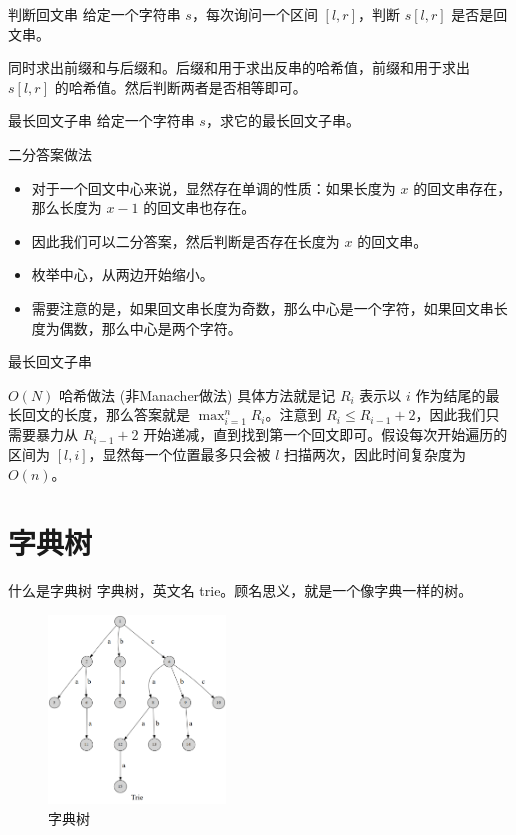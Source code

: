 \documentclass{ldr-simple-gray}
\begin{document}
  \begin{frame}{判断回文串}
    给定一个字符串 $s$，每次询问一个区间 $[l,r]$，判断 $s[l,r]$ 是否是回文串。\newline

    同时求出前缀和与后缀和。后缀和用于求出反串的哈希值，前缀和用于求出 $s[l,r]$ 的哈希值。然后判断两者是否相等即可。
  \end{frame}
  
  \begin{frame}{最长回文子串}
    给定一个字符串 $s$，求它的最长回文子串。
  
    \begin{block}{二分答案做法}
      \begin{itemize}
        \item 对于一个回文中心来说，显然存在单调的性质：如果长度为 $x$ 的回文串存在，那么长度为 $x-1$ 的回文串也存在。
        \item 因此我们可以二分答案，然后判断是否存在长度为 $x$ 的回文串。
        \item 枚举中心，从两边开始缩小。
        \item 需要注意的是，如果回文串长度为奇数，那么中心是一个字符，如果回文串长度为偶数，那么中心是两个字符。
      \end{itemize}
    \end{block}
  \end{frame}

  \begin{frame}{最长回文子串}
    \begin{block}{$O(N)$ 哈希做法 (非Manacher做法)}
      具体方法就是记 $R_i$ 表示以 $i$ 作为结尾的最长回文的长度，那么答案就是 
      $\max_{i=1}^nR_i$。注意到 $R_i\leq R_{i-1}+2$，因此我们只需要暴力从 $R_{i-1}+2$ 开始递减，直到找到第一个回文即可。假设每次开始遍历的区间为 $[l,i]$，显然每一个位置最多只会被 $l$ 扫描两次，因此时间复杂度为 $O(n)$。
    \end{block}
  \end{frame}

  \section{字典树}
  \begin{frame}{什么是字典树}
    字典树，英文名 trie。顾名思义，就是一个像字典一样的树。
    \begin{figure}
      \centering
      \includegraphics[height=5cm]{./images/trie1.png}
      \caption{字典树}
    \end{figure}
  \end{frame}
\end{document}
